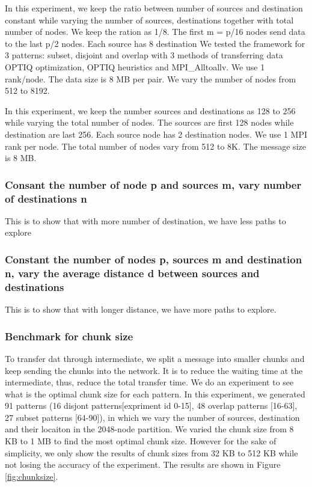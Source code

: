 In this experiment, we keep the ratio between number of sources and destination constant while varying the number of sources, destinations together with total number of nodes. We keep the ration as 1/8. The first m = p/16 nodes send data to the last p/2 nodes. Each source has 8 destination We tested the framework for 3 patterns: subset, disjoint and overlap with 3 methods of transferring data OPTIQ optimization, OPTIQ heuristics and MPI\_Alltoallv. We use 1 rank/node. The data size is 8 MB per pair. We vary the number of nodes from 512 to 8192.

In this experiment, we keep the number sources and destinations as 128 to 256 while varying the total number of nodes. The sources are first 128 nodes while destination are last 256. Each source node has 2 destination nodes. We use 1 MPI rank per node. The total number of nodes vary from 512 to 8K. The message size is 8 MB.

\subsubsection{Consant the number of node p and sources m, vary number of destinations n}
This is to show that with more number of destination, we have less paths to explore


\subsubsection{Constant the number of nodes p, sources m and destination n, vary the average distance d between sources and destinations}
This is to show that with longer distance, we have more paths to explore.

\subsubsection{Benchmark for chunk size}

To transfer dat through intermediate, we split a message into smaller chunks and keep sending the chunks into the network. It is to reduce the waiting time at the intermediate, thus, reduce the total transfer time. We do an experiment to see what is the optimal chunk size for each pattern. In this experiment, we generated 91 patterns (16 disjont patterns[expriment id 0-15], 48 overlap patterns [16-63], 27 subset patterns [64-90]), in which we vary the number of sources, destination and their locaiton in the 2048-node partition. We varied the chunk size from 8 KB to 1 MB to find the most optimal chunk size. However for the sake of simplicity, we only show the results of chunk sizes from 32 KB to 512 KB while not losing the accuracy of the experiment. The results are shown in Figure \ref{fig:chunksize}.

